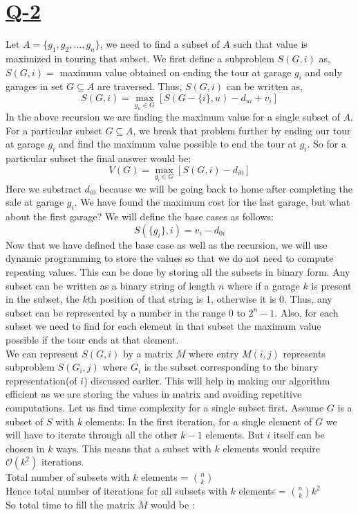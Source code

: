 \documentclass[14pt]{article}
\begin{document}
		\section*{\underline{Q-2}}
			\noindent
			Let $A = \{g_1, g_2, \dots, g_n\}$, we need to find a subset of $A$ such that value is maximized in touring that subset. We first define a subproblem $S(G, i)$ as, $S(G, i) = $ maximum value obtained on ending the tour at garage $g_i$ and only garages in set $G \subseteq A$ are traversed. Thus, $S(G, i)$ can be written as,\\
			$$ S(G, i) = \max_{g_u\in G} [S(G-\{i\}, u) - d_{ui} + v_i]$$
			In the above recursion we are finding the maximum value for a single subset of $A$. For a particular subset $G \subseteq A$, we break that problem further by ending our tour at garage $g_i$ and find the maximum value possible to end the tour at $g_i$. So for a particular subset the final answer would be:
			$$ V(G) = \max_{g_i \in G} [S(G, i) - d_{i0}]$$  
			Here we substract $d_{i0}$ because we will be going back to home after completing the sale at garage $g_i$. We have found the maximum cost for the last garage, but what about the first garage? We will define the base cases as follows:
			$$ S(\{g_i\}, i) = v_i - d_{0i} $$ 
			Now that we have defined the base case as well as the recursion, we will use dynamic programming to store the values so that we do not need to compute repeating values. This can be done by storing all the subsets in binary form. Any subset can be written as a binary string of length $n$ where if a garage $k$ is present in the subset, the $k$th position of that string is 1, otherwise it is 0. Thus, any subset can be represented by a number in the range 0 to $2^n-1$. Also, for each subset we need to find for each element in that subset the maximum value possible if the tour ends at that element.\\
			\newline
			We can represent $S(G, i)$ by a matrix $M$ where entry $M(i, j)$ represents subproblem $S(G_i, j)$ where $G_i$ is the subset corresponding to the binary representation(of $i$) discussed earlier. This will help in making our algorithm efficient as we are storing the values in matrix and avoiding repetitive computations. Let us find time complexity for a single subset first. Assume $G$ is a subset of $S$ with $k$ elements. In the first iteration, for a single element of $G$ we will have to iterate through all the other $k-1$ elements. But $i$ itself can be chosen in $k$ ways. This means that a subset with $k$ elements would require $\mathcal{O}(k^2)$ iterations. \\
			Total number of subsets with $k$ elements = $n \choose k$\\
			Hence total number of iterations for all subsets with $k$ elements = $ {n \choose k}k^2 $  \\
			So total time to fill the matrix $M$ would be :
			
\end{document}
